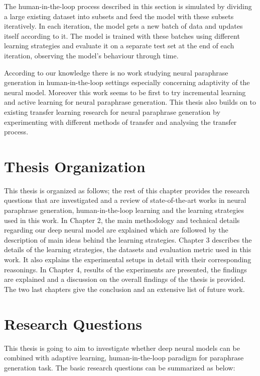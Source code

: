 The human-in-the-loop process described in this section is simulated by dividing a large existing dataset into subsets and feed the model with these subsets iteratively. In each iteration, the model gets a new batch of data and updates itself according to it. The model is trained with these batches using different learning strategies and evaluate it on a separate test set at the end of each iteration, observing the model's behaviour through time.

According to our knowledge there is no work studying neural paraphrase generation in human-in-the-loop settings especially concerning adaptivity of the neural model. Moreover this work seems to be first to try incremental learning and active learning for neural paraphrase generation. This thesis also builds on to existing transfer learning research for neural paraphrase generation by experimenting with different methods of transfer and analysing the transfer process.

\section{Thesis Organization}
This thesis is organized as follows; the rest of this chapter provides the research questions that are investigated and a review of state-of-the-art works in neural paraphrase generation, human-in-the-loop learning and the learning strategies used in this work. In Chapter 2, the main methodology and technical details regarding our deep neural model are explained which are followed by the description of main ideas behind the learning strategies. Chapter 3 describes the details of the learning strategies, the datasets and evaluation metric used in this work. It also explains the experimental setups in detail with their corresponding reasonings. In Chapter 4, results of the experiments are presented, the findings are explained and a discussion on the overall findings of the thesis is provided. The two last chapters give the conclusion and an extensive list of future work.

\section{Research Questions}

This thesis is going to aim to investigate whether deep neural models can be combined with adaptive learning, human-in-the-loop paradigm for paraphrase generation task. The basic research questions can be summarized as below:

